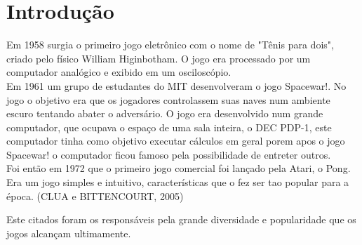 \chapter{Introdução}
\label{cap:introducao}
 
 
Em 1958 surgia o primeiro jogo eletrônico com o nome de "Tênis para dois", criado pelo físico William Higinbotham.
O jogo era processado por um computador analógico e exibido em um osciloscópio.\\
Em 1961 um grupo de estudantes do MIT desenvolveram o jogo Spacewar!. No jogo o objetivo era que os jogadores controlassem suas naves num ambiente escuro tentando abater o adversário. O jogo era desenvolvido num grande computador, que ocupava o espaço de uma sala inteira, o DEC PDP-1, este computador tinha como objetivo executar cálculos em geral porem apos o jogo Spacewar! o computador ficou famoso pela possibilidade de entreter outros.\\
Foi então em 1972 que o primeiro jogo comercial foi lançado pela Atari, o Pong. Era um jogo simples e intuitivo, características que o fez ser tao popular para a época. (CLUA e BITTENCOURT, 2005) 

\begin{figure}[h!]
		\centering
	\end{figure}


Este citados foram os responsáveis pela grande diversidade e popularidade que os jogos alcançam ultimamente.

